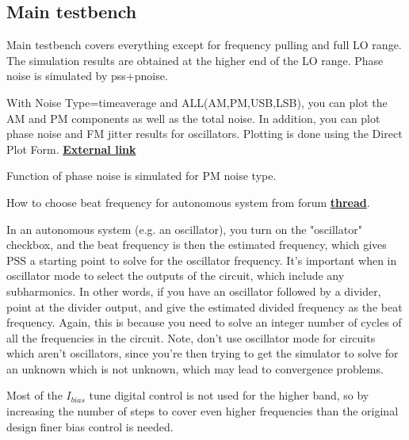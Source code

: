 \documentclass{article}
\begin{document}
\subsection{Main testbench}

Main testbench covers everything except for frequency pulling and full LO range. The simulation results are obtained at the higher end of the LO range. Phase noise is simulated by pss+pnoise.

\begin{info} %
	With Noise Type=timeaverage and ALL(AM,PM,USB,LSB), you can plot the AM and PM components as well as the total noise. In addition, you can plot phase noise and FM jitter results for oscillators. Plotting is done using the Direct Plot Form.
	\href{https://community.cadence.com/cadence_blogs_8/b/rf/posts/virtuoso-video-diary-noise-simulation-in-spectre-rf-using-improved-pnoise-hbnoise-and-direct-plot-form-options}{\textbf{External link}}
\end{info}

Function of phase noise is simulated for PM noise type.

How to choose beat frequency for autonomous system from forum \href{https://community.cadence.com/cadence_technology_forums/f/custom-ic-design/2661/beat-frequency-in-spectrerf-pss-simulation}{\textbf{thread}}.

\begin{info} %
In an autonomous system (e.g. an oscillator), you turn on the "oscillator" checkbox, and the beat frequency is then the estimated frequency, which gives PSS a starting point to solve for the oscillator frequency. It's important when in oscillator mode to select the outputs of the circuit, which include any subharmonics. In other words, if you have an oscillator followed by a divider, point at the divider output, and give the estimated divided frequency as the beat frequency. Again, this is because you need to solve an integer number of cycles of all the frequencies in the circuit. Note, don't use oscillator mode for circuits which aren't oscillators, since you're then trying to get the simulator to solve for an unknown which is not unknown, which may lead to convergence problems.
\end{info}

Most of the $I_{bias}$ tune digital control is not used for the higher band, so by increasing the number of steps to cover even higher frequencies than the original design finer bias control is needed.
\end{document}

